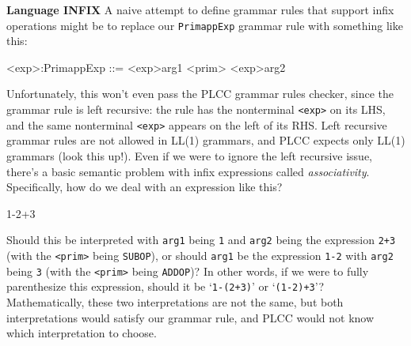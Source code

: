 \begin{minipage}[t]{\sw}
\slidenumber
\LARGE
{\bf Language INFIX}\exx
A naive attempt to define grammar rules that support infix operations might be
to replace our \verb'PrimappExp' grammar rule with something like this:
\begin{qv}
<exp>:PrimappExp  ::= <exp>arg1 <prim> <exp>arg2
\end{qv}
Unfortunately, this won't even pass the PLCC grammar rules checker,
since the grammar rule is left recursive:
the rule has the nonterminal \verb'<exp>' on its LHS,
and the same nonterminal \verb'<exp>' appears
on the left of its RHS.
Left recursive grammar rules are not allowed in LL(1) grammars,
and PLCC expects only LL(1) grammars (look this up!).\exx
Even if we were to ignore the left recursive issue,
there's a basic semantic problem with infix expressions
called {\em associativity}.
Specifically, how do we deal with an expression like this?
\begin{qv}
1-2+3
\end{qv}
Should this be interpreted with \verb'arg1' being \verb'1'
and \verb'arg2' being the expression \verb'2+3'
(with the \verb'<prim>' being \verb'SUBOP'),
or should \verb'arg1' be the expression \verb'1-2'
with \verb'arg2' being \verb'3'
(with the \verb'<prim>' being \verb'ADDOP')?
In other words, if we were to fully parenthesize this expression,
should it be `\verb'1-(2+3)'' or `\verb'(1-2)+3''?
Mathematically, these two interpretations are not the same,
but both interpretations would satisfy our grammar rule,
and PLCC would not know which interpretation to choose.
\end{minipage}

